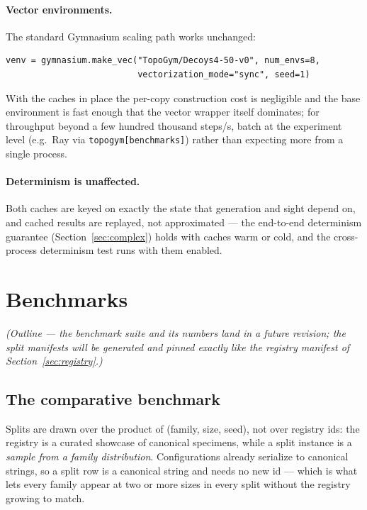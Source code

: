 \documentclass[11pt]{article}
\begin{document}
\paragraph{Vector environments.} The standard Gymnasium scaling path
works unchanged:

\begin{lstlisting}
venv = gymnasium.make_vec("TopoGym/Decoys4-50-v0", num_envs=8,
                          vectorization_mode="sync", seed=1)
\end{lstlisting}

\noindent With the caches in place the per-copy construction cost is
negligible and the base environment is fast enough that the vector
wrapper itself dominates; for throughput beyond a few hundred
thousand steps/s, batch at the experiment level (e.g.\ Ray via
\texttt{topogym[benchmarks]}) rather than expecting more from a
single process.

\paragraph{Determinism is unaffected.} Both caches are keyed on
exactly the state that generation and sight depend on, and cached
results are replayed, not approximated --- the end-to-end determinism
guarantee (Section~\ref{sec:complex}) holds with caches warm or
cold, and the cross-process determinism test runs with them enabled.

\section{Benchmarks}
\label{sec:benchmarks}

\emph{(Outline --- the benchmark suite and its numbers land in a
future revision; the split manifests will be generated and pinned
exactly like the registry manifest of Section~\ref{sec:registry}.)}

\subsection{The comparative benchmark}

Splits are drawn over the product of (family, size, seed), not over
registry ids: the registry is a curated showcase of canonical
specimens, while a split instance is a \emph{sample from a family
distribution}. Configurations already serialize to canonical strings,
so a split row is a canonical string and needs no new id --- which is
what lets every family appear at two or more sizes in every split
without the registry growing to match.
\end{document}
